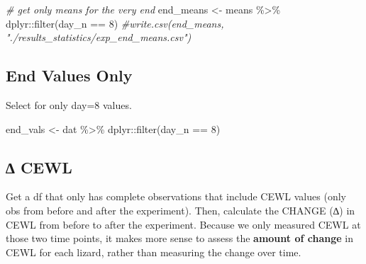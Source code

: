 \documentclass[
]{article}
\newenvironment{Shaded}{\begin{snugshade}}{\end{snugshade}}
\newcommand{\CommentTok}[1]{\textcolor[rgb]{0.56,0.35,0.01}{\textit{#1}}}
\newcommand{\DecValTok}[1]{\textcolor[rgb]{0.00,0.00,0.81}{#1}}
\newcommand{\FunctionTok}[1]{\textcolor[rgb]{0.00,0.00,0.00}{#1}}
\newcommand{\NormalTok}[1]{#1}
\newcommand{\OtherTok}[1]{\textcolor[rgb]{0.56,0.35,0.01}{#1}}
\newcommand{\SpecialCharTok}[1]{\textcolor[rgb]{0.00,0.00,0.00}{#1}}
\begin{document}
\begin{Shaded}
\begin{Highlighting}[]
\CommentTok{\# get only means for the very end}
\NormalTok{end\_means }\OtherTok{\textless{}{-}}\NormalTok{ means }\SpecialCharTok{\%\textgreater{}\%}
\NormalTok{  dplyr}\SpecialCharTok{::}\FunctionTok{filter}\NormalTok{(day\_n }\SpecialCharTok{==} \DecValTok{8}\NormalTok{)}
\CommentTok{\#write.csv(end\_means, "./results\_statistics/exp\_end\_means.csv")}
\end{Highlighting}
\end{Shaded}

\hypertarget{end-values-only}{%
\subsection{End Values Only}\label{end-values-only}}

Select for only day=8 values.

\begin{Shaded}
\begin{Highlighting}[]
\NormalTok{end\_vals }\OtherTok{\textless{}{-}}\NormalTok{ dat }\SpecialCharTok{\%\textgreater{}\%}
\NormalTok{  dplyr}\SpecialCharTok{::}\FunctionTok{filter}\NormalTok{(day\_n }\SpecialCharTok{==} \DecValTok{8}\NormalTok{)}
\end{Highlighting}
\end{Shaded}

\hypertarget{cewl}{%
\subsection{∆ CEWL}\label{cewl}}

Get a df that only has complete observations that include CEWL values
(only obs from before and after the experiment). Then, calculate the
CHANGE (∆) in CEWL from before to after the experiment. Because we only
measured CEWL at those two time points, it makes more sense to assess
the \textbf{amount of change} in CEWL for each lizard, rather than
measuring the change over time.
\end{document}
